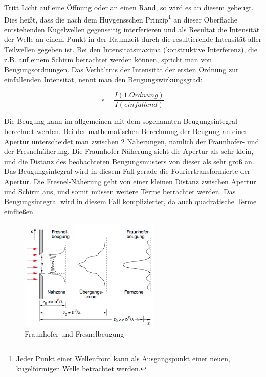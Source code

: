 Tritt Licht auf eine Öffnung oder an einen Rand, so wird es an diesem gebeugt. Dies heißt, dass die nach dem Huygensschen Prinzip\footnote[2]{Jeder Punkt einer Wellenfront kann als Ausgangspunkt einer neuen, kugelförmigen Welle betrachtet werden.} an dieser Oberfläche entstehenden Kugelwellen gegenseitig interferieren und als Resultat die Intensität der Welle an einem Punkt in der Raumzeit durch die resultierende Intensität aller Teilwellen gegeben ist. Bei den Intensitätsmaxima (konstruktive Interferenz), die z.B. auf einem Schirm betrachtet werden können, spricht man von Beugungsordnungen. Das Verhältnis der Intensität der ersten Ordnung zur einfallenden Intensität, nennt man den Beugungswirkungsgrad:

\begin{equation} \epsilon = \frac{I (1.Ordnung)}{I(einfallend)} \end{equation}

Die Beugung kann im allgemeinen mit dem sogenannten Beugungsintegral berechnet werden. Bei der mathematischen Berechnung der Beugung an einer Apertur unterscheidet man zwischen 2 Näherungen, nämlich der Fraunhofer- und der Fresnelnäherung. Die Fraunhofer-Näherung sieht die Apertur als sehr klein, und die Distanz des beobachteten Beugungsmusters von dieser als sehr groß an. Das Beugungsintegral wird in diesem Fall gerade die Fouriertransformierte der Apertur. Die Fresnel-Näherung geht von einer kleinen Distanz zwischen Apertur und Schirm aus, und somit müssen weitere Terme betrachtet werden. Das Beugungsintegral wird in diesem Fall komplizierter, da auch quadratische Terme einfließen.


\begin{figure}[H]
\centering \includegraphics[width = 0.6\textwidth]{BilderTheo/FraunhoferFresnel.png}
\caption{Fraunhofer und Fresnelbeugung\protect\footnotemark[3]}
\end{figure}


